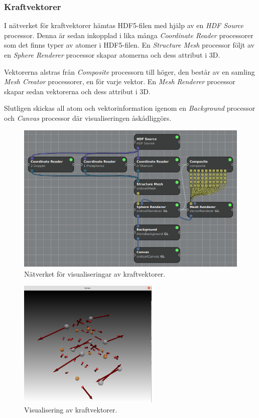 \documentclass[10pt,oneside,swedish]{article}
\begin{document}
\subsubsection{Kraftvektorer}\label{Kraftvektorer}
I nätverket för kraftvektorer hämtas HDF5-filen med hjälp av en \textit{HDF Source} processor. Denna är sedan inkopplad i lika många \textit{Coordinate Reader} processorer som det finns typer av atomer i HDF5-filen. En \textit{Structure Mesh} processor följt av en \textit{Sphere Renderer} processor skapar atomerna och dess attribut i 3D.

Vektorerna alstras från \textit{Composite} processorn till höger, den består av en samling \textit{Mesh Creator} processorer, en för varje vektor. En \textit{Mesh Renderer} processor skapar sedan vektorerna och dess attribut i 3D.

Slutligen skickas all atom och vektorinformation igenom en \textit{Background} processor och \textit{Canvas} processor där visualiseringen åskådliggörs.

\begin{figure}[H]
\centering
\includegraphics[width=1.00000\textwidth]{Images/force_network.png}
\caption{Nätverket för visualiseringar av kraftvektorer.}
\end{figure}

\begin{figure}[H]
\centering
\includegraphics[width=0.60000\textwidth]{Images/force_vectors.png}
\caption{Visualisering av kraftvektorer.}
\end{figure}
\end{document}

